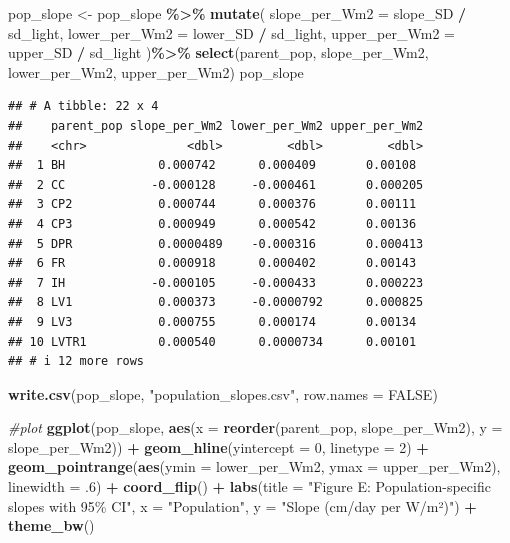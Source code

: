 \documentclass[
]{article}
\newenvironment{Shaded}{\begin{snugshade}}{\end{snugshade}}
\newcommand{\AttributeTok}[1]{\textcolor[rgb]{0.13,0.29,0.53}{#1}}
\newcommand{\CommentTok}[1]{\textcolor[rgb]{0.56,0.35,0.01}{\textit{#1}}}
\newcommand{\ConstantTok}[1]{\textcolor[rgb]{0.56,0.35,0.01}{#1}}
\newcommand{\DecValTok}[1]{\textcolor[rgb]{0.00,0.00,0.81}{#1}}
\newcommand{\FunctionTok}[1]{\textcolor[rgb]{0.13,0.29,0.53}{\textbf{#1}}}
\newcommand{\NormalTok}[1]{#1}
\newcommand{\OtherTok}[1]{\textcolor[rgb]{0.56,0.35,0.01}{#1}}
\newcommand{\SpecialCharTok}[1]{\textcolor[rgb]{0.81,0.36,0.00}{\textbf{#1}}}
\newcommand{\StringTok}[1]{\textcolor[rgb]{0.31,0.60,0.02}{#1}}
\begin{document}
\begin{Shaded}
\begin{Highlighting}[]
\NormalTok{pop\_slope }\OtherTok{\textless{}{-}}\NormalTok{ pop\_slope }\SpecialCharTok{\%\textgreater{}\%}
  \FunctionTok{mutate}\NormalTok{(}
    \AttributeTok{slope\_per\_Wm2 =}\NormalTok{ slope\_SD }\SpecialCharTok{/}\NormalTok{ sd\_light,}
    \AttributeTok{lower\_per\_Wm2 =}\NormalTok{ lower\_SD }\SpecialCharTok{/}\NormalTok{ sd\_light,}
    \AttributeTok{upper\_per\_Wm2 =}\NormalTok{ upper\_SD }\SpecialCharTok{/}\NormalTok{ sd\_light}
\NormalTok{  )}\SpecialCharTok{\%\textgreater{}\%}
  \FunctionTok{select}\NormalTok{(parent\_pop, slope\_per\_Wm2, lower\_per\_Wm2, upper\_per\_Wm2)}
\NormalTok{pop\_slope}
\end{Highlighting}
\end{Shaded}

\begin{verbatim}
## # A tibble: 22 x 4
##    parent_pop slope_per_Wm2 lower_per_Wm2 upper_per_Wm2
##    <chr>              <dbl>         <dbl>         <dbl>
##  1 BH             0.000742      0.000409       0.00108 
##  2 CC            -0.000128     -0.000461       0.000205
##  3 CP2            0.000744      0.000376       0.00111 
##  4 CP3            0.000949      0.000542       0.00136 
##  5 DPR            0.0000489    -0.000316       0.000413
##  6 FR             0.000918      0.000402       0.00143 
##  7 IH            -0.000105     -0.000433       0.000223
##  8 LV1            0.000373     -0.0000792      0.000825
##  9 LV3            0.000755      0.000174       0.00134 
## 10 LVTR1          0.000540      0.0000734      0.00101 
## # i 12 more rows
\end{verbatim}

\begin{Shaded}
\begin{Highlighting}[]
\FunctionTok{write.csv}\NormalTok{(pop\_slope, }\StringTok{"population\_slopes.csv"}\NormalTok{, }\AttributeTok{row.names =} \ConstantTok{FALSE}\NormalTok{)}

\CommentTok{\#plot}
\FunctionTok{ggplot}\NormalTok{(pop\_slope, }\FunctionTok{aes}\NormalTok{(}\AttributeTok{x =} \FunctionTok{reorder}\NormalTok{(parent\_pop, slope\_per\_Wm2), }\AttributeTok{y =}\NormalTok{ slope\_per\_Wm2)) }\SpecialCharTok{+}
  \FunctionTok{geom\_hline}\NormalTok{(}\AttributeTok{yintercept =} \DecValTok{0}\NormalTok{, }\AttributeTok{linetype =} \DecValTok{2}\NormalTok{) }\SpecialCharTok{+}
  \FunctionTok{geom\_pointrange}\NormalTok{(}\FunctionTok{aes}\NormalTok{(}\AttributeTok{ymin =}\NormalTok{ lower\_per\_Wm2, }\AttributeTok{ymax =}\NormalTok{ upper\_per\_Wm2), }\AttributeTok{linewidth =}\NormalTok{ .}\DecValTok{6}\NormalTok{) }\SpecialCharTok{+}
  \FunctionTok{coord\_flip}\NormalTok{() }\SpecialCharTok{+}
  \FunctionTok{labs}\NormalTok{(}\AttributeTok{title =} \StringTok{"Figure E: Population{-}specific slopes with 95\% CI"}\NormalTok{,}
       \AttributeTok{x =} \StringTok{"Population"}\NormalTok{, }\AttributeTok{y =} \StringTok{"Slope (cm/day per W/m²)"}\NormalTok{) }\SpecialCharTok{+}
  \FunctionTok{theme\_bw}\NormalTok{()}
\end{Highlighting}
\end{Shaded}
\end{document}

